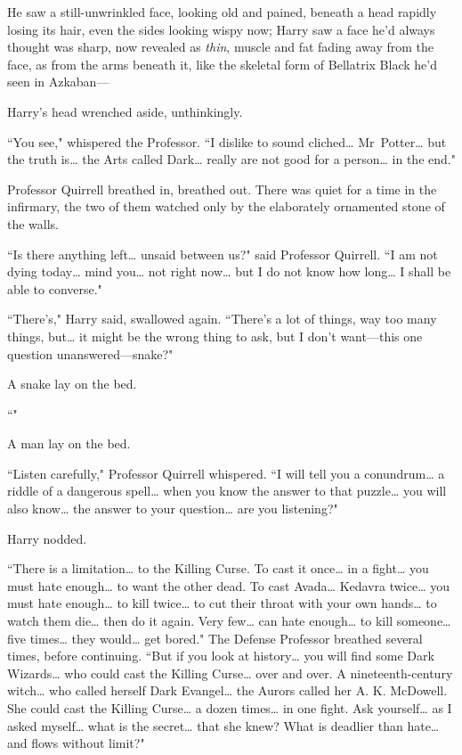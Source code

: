 He saw a still-unwrinkled face, looking old and pained, beneath a head rapidly losing its hair, even the sides looking wispy now; Harry saw a face he'd always thought was sharp, now revealed as \emph{thin}, muscle and fat fading away from the face, as from the arms beneath it, like the skeletal form of Bellatrix Black he'd seen in Azkaban—

Harry's head wrenched aside, unthinkingly.

``You see," whispered the Professor. ``I dislike to sound cliched{\ldots} Mr~Potter{\ldots} but the truth is{\ldots} the Arts called Dark{\ldots} really are not good for a person{\ldots} in the end."

Professor Quirrell breathed in, breathed out. There was quiet for a time in the infirmary, the two of them watched only by the elaborately ornamented stone of the walls.

``Is there anything left{\ldots} unsaid between us?" said Professor Quirrell. ``I am not dying today{\ldots} mind you{\ldots} not right now{\ldots} but I do not know how long{\ldots} I shall be able to converse."

``There's," Harry said, swallowed again. ``There's a lot of things, way too many things, but{\ldots} it might be the wrong thing to ask, but I don't want—this one question unanswered—snake?"

A snake lay on the bed.

``"

A man lay on the bed.

``Listen carefully," Professor Quirrell whispered. ``I will tell you a conundrum{\ldots} a riddle of a dangerous spell{\ldots} when you know the answer to that puzzle{\ldots} you will also know{\ldots} the answer to your question{\ldots} are you listening?"

Harry nodded.

``There is a limitation{\ldots} to the Killing Curse. To cast it once{\ldots} in a fight{\ldots} you must hate enough{\ldots} to want the other dead. To cast Avada{\ldots} Kedavra twice{\ldots} you must hate enough{\ldots} to kill twice{\ldots} to cut their throat with your own hands{\ldots} to watch them die{\ldots} then do it again. Very few{\ldots} can hate enough{\ldots} to kill someone{\ldots} five times{\ldots} they would{\ldots} get bored." The Defense Professor breathed several times, before continuing. ``But if you look at history{\ldots} you will find some Dark Wizards{\ldots} who could cast the Killing Curse{\ldots} over and over. A nineteenth-century witch{\ldots} who called herself Dark Evangel{\ldots} the Aurors called her A. K. McDowell. She could cast the Killing Curse{\ldots} a dozen times{\ldots} in one fight. Ask yourself{\ldots} as I asked myself{\ldots} what is the secret{\ldots} that she knew? What is deadlier than hate{\ldots} and flows without limit?"

